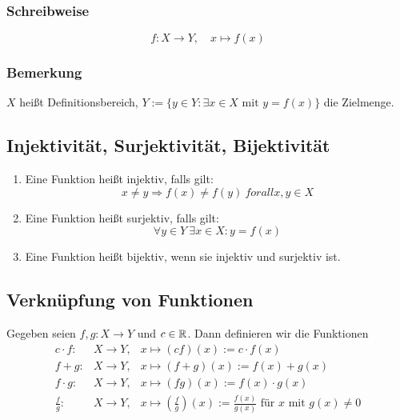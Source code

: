 \subsubsection{Schreibweise}
\begin{equation*}
    f: X \rightarrow Y,\quad x \mapsto f(x)
\end{equation*}


\subsubsection{Bemerkung}
$X$ heißt Definitionsbereich, $Y := \{y \in Y: \exists x \in X \text{ mit }
y=f(x)\}$ die Zielmenge.

\subsection{Injektivität, Surjektivität, Bijektivität}
\begin{enumerate}[label= (\alph*)]
    \item Eine Funktion heißt injektiv, falls gilt:
        \begin{equation*}
            x \neq y \Rightarrow f(x) \neq f(y)\ forall x,y\in X
        \end{equation*}
    \item Eine Funktion heißt surjektiv, falls gilt:
         \begin{equation*}
            \forall y \in Y\ \exists x \in X: y=f(x)
         \end{equation*}
     \item Eine Funktion heißt bijektiv, wenn sie injektiv und
        surjektiv ist.
\end{enumerate}

\subsection{Verknüpfung von Funktionen}
Gegeben seien $f,g: X \rightarrow Y$ und $c \in \mathbb{R}$. Dann definieren wir
die Funktionen
\begin{eqnarray*}
    c \cdot f: &X \rightarrow Y, &x \mapsto (cf)(x):=c \cdot f(x)\\
    f+g: &X \rightarrow Y, &x \mapsto (f+g)(x) := f(x) + g(x)\\
    f \cdot g: &X \rightarrow Y, &x \mapsto (fg)(x) := f(x) \cdot g(x)\\
    \frac{f}{g}: &X \rightarrow Y, &x \mapsto (\frac{f}{g})(x) :=
    \frac{f(x)}{g(x)} \text{ für } x \text{ mit } g(x) \neq 0
\end{eqnarray*}

